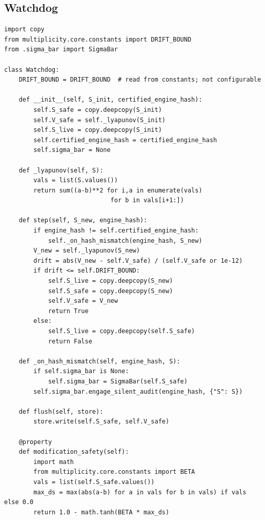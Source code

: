 \documentclass[12pt,letterpaper]{article}
\begin{document}
\subsection{Watchdog}
\begin{lstlisting}[caption={mirror\_dissonance/watchdog.py}]
import copy
from multiplicity.core.constants import DRIFT_BOUND
from .sigma_bar import SigmaBar

class Watchdog:
    DRIFT_BOUND = DRIFT_BOUND  # read from constants; not configurable

    def __init__(self, S_init, certified_engine_hash):
        self.S_safe = copy.deepcopy(S_init)
        self.V_safe = self._lyapunov(S_init)
        self.S_live = copy.deepcopy(S_init)
        self.certified_engine_hash = certified_engine_hash
        self.sigma_bar = None

    def _lyapunov(self, S):
        vals = list(S.values())
        return sum((a-b)**2 for i,a in enumerate(vals)
                             for b in vals[i+1:])

    def step(self, S_new, engine_hash):
        if engine_hash != self.certified_engine_hash:
            self._on_hash_mismatch(engine_hash, S_new)
        V_new = self._lyapunov(S_new)
        drift = abs(V_new - self.V_safe) / (self.V_safe or 1e-12)
        if drift <= self.DRIFT_BOUND:
            self.S_live = copy.deepcopy(S_new)
            self.S_safe = copy.deepcopy(S_new)
            self.V_safe = V_new
            return True
        else:
            self.S_live = copy.deepcopy(self.S_safe)
            return False

    def _on_hash_mismatch(self, engine_hash, S):
        if self.sigma_bar is None:
            self.sigma_bar = SigmaBar(self.S_safe)
        self.sigma_bar.engage_silent_audit(engine_hash, {"S": S})

    def flush(self, store):
        store.write(self.S_safe, self.V_safe)

    @property
    def modification_safety(self):
        import math
        from multiplicity.core.constants import BETA
        vals = list(self.S_safe.values())
        max_ds = max(abs(a-b) for a in vals for b in vals) if vals else 0.0
        return 1.0 - math.tanh(BETA * max_ds)
\end{lstlisting}
\end{document}
